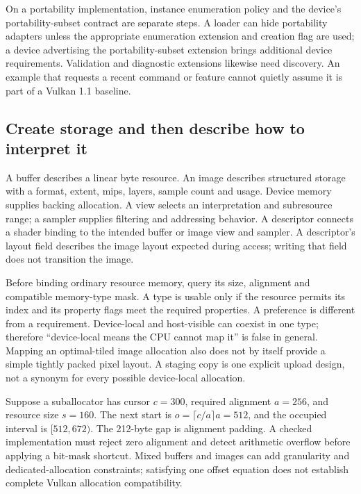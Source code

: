 On a portability implementation, instance enumeration policy and the device's portability-subset contract are separate steps. A loader can hide portability adapters unless the appropriate enumeration extension and creation flag are used; a device advertising the portability-subset extension brings additional device requirements. Validation and diagnostic extensions likewise need discovery. An example that requests a recent command or feature cannot quietly assume it is part of a Vulkan 1.1 baseline.

\subsection{Create storage and then describe how to interpret it}\label{01-foundations-i-ch011-create-storage-and-then-describe-how-to-interpret-it}

A buffer describes a linear byte resource. An image describes structured storage with a format, extent, mips, layers, sample count and usage. Device memory supplies backing allocation. A view selects an interpretation and subresource range; a sampler supplies filtering and addressing behavior. A descriptor connects a shader binding to the intended buffer or image view and sampler. A descriptor's layout field describes the image layout expected during access; writing that field does not transition the image.

Before binding ordinary resource memory, query its size, alignment and compatible memory-type mask. A type is usable only if the resource permits its index and its property flags meet the required properties. A preference is different from a requirement. Device-local and host-visible can coexist in one type; therefore ``device-local means the CPU cannot map it'' is false in general. Mapping an optimal-tiled image allocation also does not by itself provide a simple tightly packed pixel layout. A staging copy is one explicit upload design, not a synonym for every possible device-local allocation.

Suppose a suballocator has cursor \(c=300\), required alignment \(a=256\), and resource size \(s=160\). The next start is \(o=\lceil c/a\rceil a=512\), and the occupied interval is \([512,672)\). The 212-byte gap is alignment padding. A checked implementation must reject zero alignment and detect arithmetic overflow before applying a bit-mask shortcut. Mixed buffers and images can add granularity and dedicated-allocation constraints; satisfying one offset equation does not establish complete Vulkan allocation compatibility.


